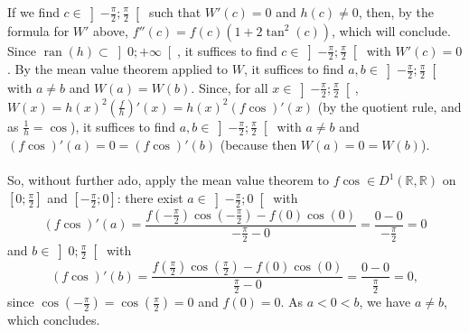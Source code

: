 \begin{solution}
    If we find \( c \in \left]-\frac{\pi}{2};\frac{\pi}{2}\right[ \) such that \( W'\left(c\right) = 0 \) and \( h\left(c\right) \neq 0 \), then, by the formula for \( W' \) above, \( f''\left(c\right) = f\left(c\right)\left(1+2\tan^2\left(c\right)\right) \), which will conclude. Since \( \operatorname{ran}\left(h\right) \subset \left]0;+\infty\right[ \), it suffices to find \( c \in \left]-\frac{\pi}{2};\frac{\pi}{2}\right[ \) with \( W'\left(c\right) = 0 \). By the mean value theorem applied to \( W \), it suffices to find \( a, b \in \left]-\frac{\pi}{2};\frac{\pi}{2}\right[ \) with \( a \neq b \) and \( W\left(a\right) = W\left(b\right) \). Since, for all \( x \in \left]-\frac{\pi}{2};\frac{\pi}{2}\right[ \), \( W\left(x\right) = h\left(x\right)^2\left(\frac{f}{h}\right)'\left(x\right) = h\left(x\right)^2\left(f\cos\right)'\left(x\right) \) (by the quotient rule, and as \( \frac{1}{h} = \cos \)), it suffices to find \( a, b \in \left]-\frac{\pi}{2};\frac{\pi}{2}\right[ \) with \( a \neq b \) and \( \left(f\cos\right)'\left(a\right) = 0 = \left(f\cos\right)'\left(b\right) \) (because then \( W\left(a\right) = 0 = W\left(b\right) \)).
    \\\\
    So, without further ado, apply the mean value theorem to \( f\cos \in D^1\left(\mathbb{R},\mathbb{R}\right) \) on \( \left[0;\frac{\pi}{2}\right] \) and \( \left[-\frac{\pi}{2};0\right] \): there exist \( a \in \left]-\frac{\pi}{2};0\right[ \) with
    \[
        \left(f\cos\right)'\left(a\right) = \frac{f\left(-\frac{\pi}{2}\right)\cos\left(-\frac{\pi}{2}\right)-f\left(0\right)\cos\left(0\right)}{-\frac{\pi}{2}-0} = \frac{0-0}{-\frac{\pi}{2}} = 0
    \]
    and \( b \in \left]0;\frac{\pi}{2}\right[ \) with
    \[
        \left(f\cos\right)'\left(b\right) = \frac{f\left(\frac{\pi}{2}\right)\cos\left(\frac{\pi}{2}\right)-f\left(0\right)\cos\left(0\right)}{\frac{\pi}{2}-0} = \frac{0-0}{\frac{\pi}{2}} = 0,
    \]
    since \( \cos\left(-\frac{\pi}{2}\right) = \cos\left(\frac{\pi}{2}\right) = 0 \) and \( f\left(0\right) = 0 \). As \( a < 0 < b \), we have \( a \neq b \), which concludes.
\end{solution}
